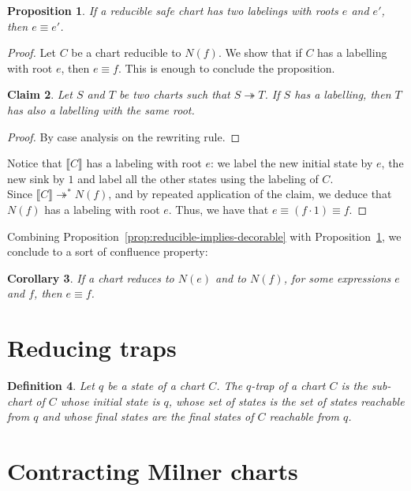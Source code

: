 \documentclass{article}
\newtheorem{definition}{Definition}[section]
\newtheorem{proposition}[definition]{Proposition}
\newtheorem{claim}[definition]{Claim}
\newtheorem{corollary}[definition]{Corollary}
\begin{document}
\begin{proposition}
   If a reducible safe chart has two labelings with roots $e$ and $e'$, 
   then $e \equiv e'$.~\label{prop:two-decorations-implies-equiv}
\end{proposition}
\begin{proof} Let $C$ be a chart reducible to $N(f)$. We show that if $C$ has a labelling with root $e$, then $e\equiv f$.  This is enough to conclude the proposition. 
  
  \begin{claim} Let $S$ and $T$ be two charts such that $S \twoheadrightarrow T$. 
    If $S$ has a labelling, then $T$ has also a labelling with the same root.
  \end{claim}
\begin{proof}
  By case analysis on the rewriting rule.
\end{proof}

 Notice that $\llbracket C\rrbracket$ has a labeling with root $e$: we label the new initial state by $e$, the new sink by $1$ and label all the other states using the labeling of $C$.~\\

Since $\llbracket C\rrbracket \twoheadrightarrow^* N(f)$, and  by repeated application of the claim, we deduce that $N(f)$ has a labeling with root $e$.  Thus, we have that $e\equiv (f\cdot 1)\equiv f$.
\end{proof}

Combining Proposition~\ref{prop:reducible-implies-decorable} with Proposition~\ref{prop:two-decorations-implies-equiv}, 
we conclude to a sort of confluence property:
\begin{corollary} If a chart reduces to $N(e)$ and to $N(f)$, for some expressions $e$ and 
  $f$, then $e\equiv f$.
\end{corollary}
\section{Reducing traps}

\begin{definition} Let $q$ be a state of a chart $C$.
  The $q$-\emph{trap} of a chart $C$ is the sub-chart of $C$ whose initial state is $q$, whose set of states is the set of states reachable from $q$ and whose final states are the final states of $C$ reachable from $q$.
\end{definition}

\section{Contracting Milner charts}
\end{document}
